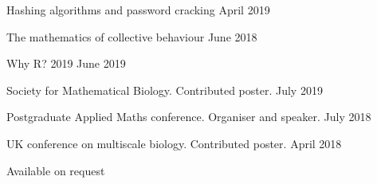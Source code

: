 \documentclass[12pt, a4paper]{article}
\begin{document}
%
         {Hashing algorithms and password cracking}%
         {April 2019}

%
         {The mathematics of collective behaviour}%
         {June 2018}




%
         {Why R? 2019}%
         {June 2019}%

%
         {Society for Mathematical Biology. Contributed poster.}%
         {July 2019}

%
         {Postgraduate Applied Maths conference. Organiser and speaker.}%
         {July 2018}

%
         {UK conference on multiscale biology. Contributed poster.}%
         {April 2018}





\vspace{2mm}

Available on request
\end{document}
